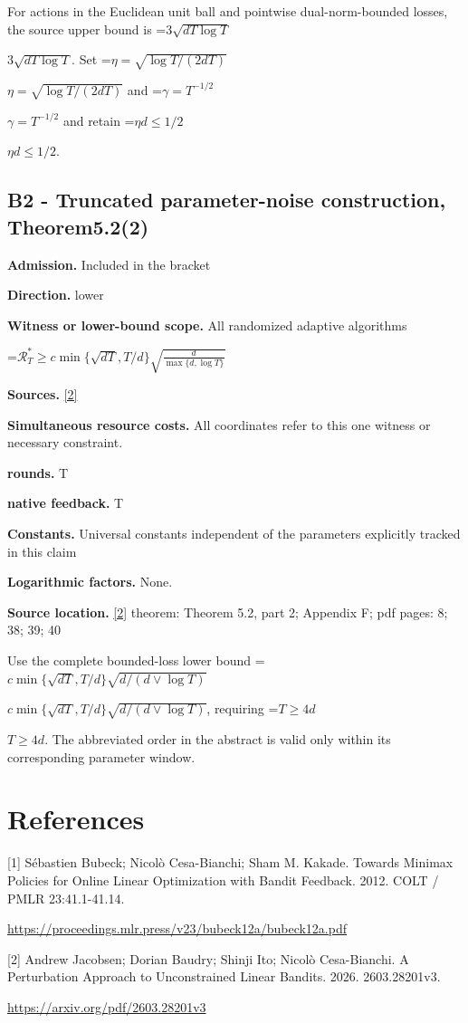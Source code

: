 \documentclass[10pt,a4paper]{article}
\newcommand{\AtlasMath}[1]{\par\begingroup\centering\setbox0=\hbox{$\displaystyle #1$}\ifdim\wd0>1.4\linewidth\typeout{ATLAS WIDE FORMULA: \the\wd0}\fi\ifdim\wd0>\linewidth\resizebox{\linewidth}{!}{\box0}\else\box0\fi\par\endgroup}
\newcommand{\AtlasInlineMath}[1]{\begingroup\setbox0=\hbox{$#1$}\ifdim\wd0>.4\linewidth\endgroup\AtlasMath{#1}\else\endgroup$#1$\fi}
\begin{document}
For actions in the Euclidean unit ball and pointwise dual-norm-bounded losses, the source upper bound is \AtlasInlineMath{3\sqrt{dT\log T}}. Set \AtlasInlineMath{\eta=\sqrt{\log T/(2dT)}} and \AtlasInlineMath{\gamma=T^{-1/2}} and retain \AtlasInlineMath{\eta d\le1/2}.

\subsection{B2 - Truncated parameter-noise construction, Theorem5.2(2)}
\textbf{Admission.} Included in the bracket

\textbf{Direction.} lower

\textbf{Witness or lower-bound scope.} All randomized adaptive algorithms

\AtlasMath{\mathcal{R}_T^*\ge c\min\{\sqrt{dT},T/d\}\sqrt{\frac{d}{\max\{d,\log T\}}}}
\textbf{Sources.} \href{https://arxiv.org/pdf/2603.28201v3}{[2]}

\textbf{Simultaneous resource costs.} All coordinates refer to this one witness or necessary constraint.

\textbf{rounds.} T

\textbf{native feedback.} T

\textbf{Constants.} Universal constants independent of the parameters explicitly tracked in this claim

\textbf{Logarithmic factors.} None.

\textbf{Source location.} \href{https://arxiv.org/pdf/2603.28201v3}{[2]} theorem: Theorem 5.2, part 2; Appendix F; pdf pages: 8; 38; 39; 40

Use the complete bounded-loss lower bound \AtlasInlineMath{c\min\{\sqrt{dT},T/d\}\sqrt{d/(d\vee\log T)}}, requiring \AtlasInlineMath{T\ge4d}. The abbreviated order in the abstract is valid only within its corresponding parameter window.

\section{References}
[1] Sébastien Bubeck; Nicolò Cesa-Bianchi; Sham M. Kakade. Towards Minimax Policies for Online Linear Optimization with Bandit Feedback. 2012. COLT / PMLR 23:41.1-41.14.

\url{https://proceedings.mlr.press/v23/bubeck12a/bubeck12a.pdf}

[2] Andrew Jacobsen; Dorian Baudry; Shinji Ito; Nicolò Cesa-Bianchi. A Perturbation Approach to Unconstrained Linear Bandits. 2026. 2603.28201v3.

\url{https://arxiv.org/pdf/2603.28201v3}
\end{document}
